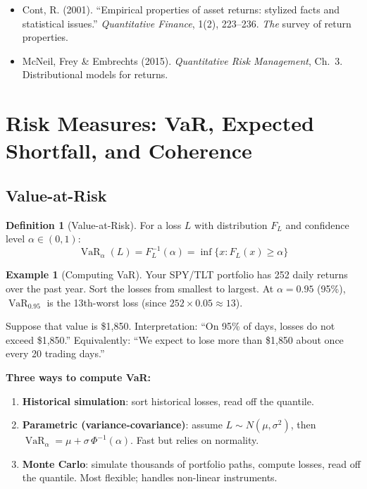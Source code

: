 \documentclass[11pt, a4paper]{article}
\theoremstyle{definition}
\newtheorem{definition}{Definition}[section]
\newtheorem{example}{Example}[section]
\theoremstyle{plain}
\theoremstyle{remark}
\newcommand{\VaR}{\operatorname{VaR}}
\begin{document}
\begin{refbox}
\begin{itemize}
    \item Cont, R. (2001). ``Empirical properties of asset returns: stylized facts and statistical issues.'' \emph{Quantitative Finance}, 1(2), 223--236. \textit{The} survey of return properties.
    \item McNeil, Frey \& Embrechts (2015). \emph{Quantitative Risk Management}, Ch.~3. Distributional models for returns.
\end{itemize}
\end{refbox}

\section{Risk Measures: VaR, Expected Shortfall, and Coherence}
\label{sec:risk-measures}

\subsection{Value-at-Risk}

\begin{definition}[Value-at-Risk]
For a loss $L$ with distribution $F_L$ and confidence level $\alpha \in (0,1)$:
\[
    \VaR_\alpha(L) = F_L^{-1}(\alpha) = \inf\{x : F_L(x) \geq \alpha\}
\]
\end{definition}

\begin{example}[Computing VaR]
Your SPY/TLT portfolio has 252 daily returns over the past year.
Sort the losses from smallest to largest.
At $\alpha = 0.95$ (95\%), $\VaR_{0.95}$ is the 13th-worst loss (since $252 \times 0.05 \approx 13$).

Suppose that value is \$1{,}850.
Interpretation: ``On 95\% of days, losses do not exceed \$1{,}850.''
Equivalently: ``We expect to lose more than \$1{,}850 about once every 20 trading days.''
\end{example}

\textbf{Three ways to compute VaR:}
\begin{enumerate}
    \item \textbf{Historical simulation}: sort historical losses, read off the quantile.
    \item \textbf{Parametric (variance-covariance)}: assume $L \sim N(\mu, \sigma^2)$, then $\VaR_\alpha = \mu + \sigma \, \Phi^{-1}(\alpha)$. Fast but relies on normality.
    \item \textbf{Monte Carlo}: simulate thousands of portfolio paths, compute losses, read off the quantile. Most flexible; handles non-linear instruments.
\end{enumerate}
\end{document}
